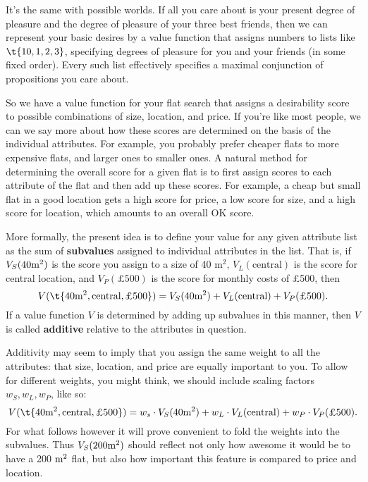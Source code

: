 
It's the same with possible worlds. If all you care about is your
present degree of pleasure and the degree of pleasure of your three
best friends, then we can represent your basic desires by a value
function that assigns numbers to lists like $\t{10, 1, 2, 3}$,
specifying degrees of pleasure for you and your friends (in some fixed
order). Every such list effectively specifies a maximal conjunction of
propositions you care about.

So we have a value function for your flat search that assigns a
desirability score to possible combinations of size, location, and
price. If you're like most people, we can we say more about how these
scores are determined on the basis of the individual attributes. For
example, you probably prefer cheaper flats to more expensive flats,
and larger ones to smaller ones. A natural method for determining the
overall score for a given flat is to first assign scores to each
attribute of the flat and then add up these scores. For example, a
cheap but small flat in a good location gets a high score for price, a
low score for size, and a high score for location, which amounts to an
overall OK score.

More formally, the present idea is to define your value for any given
attribute list as the sum of \textbf{subvalues} assigned to individual
attributes in the list. That is, if $V_{S}(40 \text{m}^2)$ is the score you
assign to a size of 40 m$^2$, $V_{L}(\text{central})$ is the score for
central location, and $V_{P}(\text{£500})$ is the score for monthly
costs of £500, then
\[
V(\t{40 \m^2, \text{central}, \text{£500}}) = V_{S}(40 \m^2) +
V_{L}(\text{central}) + V_{P}(\text{£500}).
\]
%
If a value function $V$ is determined by adding up subvalues
in this manner, then $V$ is called \textbf{additive} relative to the
attributes in question.

Additivity may seem to imply that you assign the same weight to
all the attributes: that size, location, and price are equally
important to you. To allow for different weights, you might think, we
should include scaling factors $w_S, w_L, w_P$, like so:
\[
V(\t{40 \m^2, \text{central}, \text{£500}}) = w_s \cdot V_{S}(40 \m^2) +
w_L \cdot V_{L}(\text{central}) + w_P \cdot V_{P}(\text{£500}).
\]
For what follows however it will prove convenient to fold the weights
into the subvalues. Thus $V_S(200 \text{m}^2)$ should reflect not only how
awesome it would be to have a 200 $\text{m}^2$ flat, but also how important
this feature is compared to price and location.

